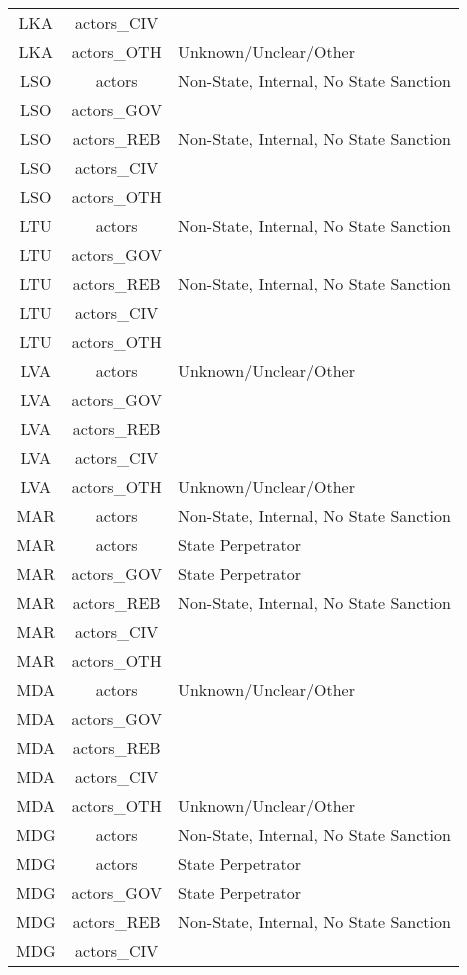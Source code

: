 \documentclass[12pt]{article}
\begin{document}
\begin{center}
\begin{longtable}{|c|c|p{10cm}|}
  LKA & actors\_CIV &  \\ 
  LKA & actors\_OTH & Unknown/Unclear/Other \\ 
  LSO & actors & Non-State, Internal, No State Sanction \\ 
  LSO & actors\_GOV &  \\ 
  LSO & actors\_REB & Non-State, Internal, No State Sanction \\ 
  LSO & actors\_CIV &  \\ 
  LSO & actors\_OTH &  \\ 
  LTU & actors & Non-State, Internal, No State Sanction \\ 
  LTU & actors\_GOV &  \\ 
  LTU & actors\_REB & Non-State, Internal, No State Sanction \\ 
  LTU & actors\_CIV &  \\ 
  LTU & actors\_OTH &  \\ 
  LVA & actors & Unknown/Unclear/Other \\ 
  LVA & actors\_GOV &  \\ 
  LVA & actors\_REB &  \\ 
  LVA & actors\_CIV &  \\ 
  LVA & actors\_OTH & Unknown/Unclear/Other \\ 
  MAR & actors & Non-State, Internal, No State Sanction \\ 
  MAR & actors & State Perpetrator \\ 
  MAR & actors\_GOV & State Perpetrator \\ 
  MAR & actors\_REB & Non-State, Internal, No State Sanction \\ 
  MAR & actors\_CIV &  \\ 
  MAR & actors\_OTH &  \\ 
  MDA & actors & Unknown/Unclear/Other \\ 
  MDA & actors\_GOV &  \\ 
  MDA & actors\_REB &  \\ 
  MDA & actors\_CIV &  \\ 
  MDA & actors\_OTH & Unknown/Unclear/Other \\ 
  MDG & actors & Non-State, Internal, No State Sanction \\ 
  MDG & actors & State Perpetrator \\ 
  MDG & actors\_GOV & State Perpetrator \\ 
  MDG & actors\_REB & Non-State, Internal, No State Sanction \\ 
  MDG & actors\_CIV &  \\ 

\end{longtable}
\end{center}
\end{document}
